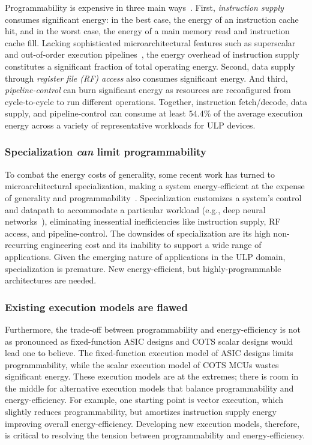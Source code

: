 Programmability is expensive in three main ways~\cite{horowitz:isscc14:energy-keynote,hameed2010understanding,balfour_elm_thesis}.
First, \emph{instruction supply} consumes significant energy: in the best case, the energy of
an instruction cache hit, and in the worst case, the energy of a main memory
read and instruction cache fill.  
%
Lacking sophisticated microarchitectural features such as superscalar and
out-of-order execution pipelines~\cite{msp430fr5994,traber2016pulpino}, the energy overhead of
instruction supply constitutes a significant fraction of total operating energy.
%
Second, data supply through \emph{register file (RF) access} also consumes significant energy.
% 
And third, \emph{pipeline-control} can burn significant energy as resources are reconfigured from cycle-to-cycle to run different operations.
%
Together, instruction fetch/decode, data supply, and pipeline-control can consume at least $54.4\%$ of the average execution energy across a variety of representative workloads for ULP devices.

\subsubsection{Specialization \emph{can} limit programmability}
To combat the energy costs of generality, some recent work has turned to
microarchitectural specialization, making a system energy-efficient at the
expense of generality and
programmability~\cite{chen:isca16:eyeriss,chen:asplos14:diannao,du:isca15:shidiannao,liu:isca15:pudiannao,chen2014dadiannao,venkatesh2010conservation}.
% 
Specialization customizes a system's control and datapath to accommodate a
particular workload (e.g., deep neural networks~\cite{chen:isca16:eyeriss,chen:asplos14:diannao}),
eliminating inessential inefficiencies like instruction supply, RF access, and pipeline-control.
% 
The downsides of specialization are its high non-recurring engineering cost and its inability to support a wide range of applications.
% 
Given the emerging nature of applications in the ULP domain, specialization is premature.
% 
New energy-efficient, but highly-programmable architectures are needed.

\subsubsection{Existing execution models are flawed}
Furthermore, the trade-off between programmability and energy-efficiency is not as pronounced as fixed-function ASIC designs and COTS scalar designs would lead one to believe.
% 
The fixed-function execution model of ASIC designs limits programmability, while the scalar execution model of COTS MCUs wastes significant energy.
% 
These execution models are at the extremes; there is room in the middle for alternative execution models that balance programmability and energy-efficiency.
% 
For example, one starting point is vector execution, which slightly reduces programmability, but amortizes instruction supply energy improving overall energy-efficiency.
% 
Developing new execution models, therefore, is critical to resolving the tension between programmability and energy-efficiency.

